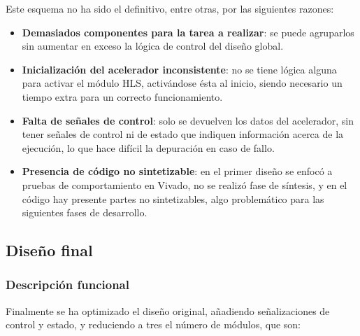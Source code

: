 Este esquema no ha sido el definitivo, entre otras, por las siguientes razones:

\begin{itemize}
    \item \textbf{Demasiados componentes para la tarea a realizar}: se puede agruparlos sin aumentar en exceso la lógica de control del diseño global.
    \item \textbf{Inicialización del acelerador inconsistente}: no se tiene lógica alguna para activar el módulo HLS, activándose ésta al inicio, siendo necesario un tiempo extra para un correcto funcionamiento.
    \item \textbf{Falta de señales de control}: solo se devuelven los datos del acelerador, sin tener señales de control ni de estado que indiquen información acerca de la ejecución, lo que hace difícil la depuración en caso de fallo.
    \item \textbf{Presencia de código no sintetizable}: en el primer diseño se enfocó a pruebas de comportamiento en Vivado, no se realizó fase de síntesis, y en el código hay presente partes no sintetizables, algo problemático para las siguientes fases de desarrollo.
\end{itemize}

\subsection{Diseño final}
\subsubsection{Descripción funcional}
Finalmente se ha optimizado el diseño original, añadiendo señalizaciones de control y estado, y reduciendo a tres el número de módulos, que son:

